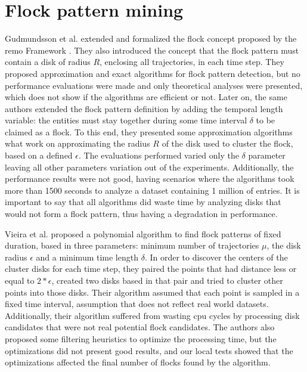\section{Flock pattern mining}
\label{sec:rel_flocks}
Gudmundsson et al. \citep{gudefficient} \citep{gudlongest} extended and formalized the flock concept proposed by the
\ac{remo} Framework \citep{remo}. They also introduced the concept that the flock pattern must contain a disk of radius
$R$, enclosing all trajectories, in each time step. They proposed approximation and exact algorithms for flock pattern
detection, but no performance evaluations were made and only theoretical analyses were presented, which does not show if
the algorithms are efficient or not. Later on, the same authors \citep{gudlongest} extended the flock pattern definition
by adding the temporal length variable: the entities must stay together during some time interval $\delta$ to be claimed
as a flock. To this end, they presented some approximation algorithms what work on approximating the radius $R$ of the
disk used to cluster the flock, based on a defined $\epsilon$. The evaluations performed \citep{gudlongest} varied only
the $\delta$ parameter leaving all other parameters variation out of the experiments. Additionally, the performance
results were not good, having scenarios where the algorithms took more than 1500 seconds to analyze a dataset containing
1 million of entries. It is important to say that all algorithms did waste time by analyzing disks that would not form a
flock pattern, thus having a degradation in performance.

Vieira et al. \citep{vieira} proposed a polynomial algorithm to find flock patterns of fixed duration, based in three
parameters: minimum number of trajectories $\mu$, the disk radius $\epsilon$ and a minimum time length $\delta$.  In
order to discover the centers of the cluster disks for each time step, they paired the points that had distance less or
equal to $2*\epsilon$, created two disks based in that pair and tried to cluster other points into those disks. Their
algorithm assumed that each point is sampled in a fixed time interval, assumption that does not reflect real world
datasets. Additionally, their algorithm suffered from wasting \ac{cpu} cycles by processing disk candidates that were
not real potential flock candidates. The authors also proposed some filtering heuristics to optimize the processing
time, but the optimizations did not present good results, and our local tests showed that the optimizations affected the
final number of flocks found by the algorithm.


